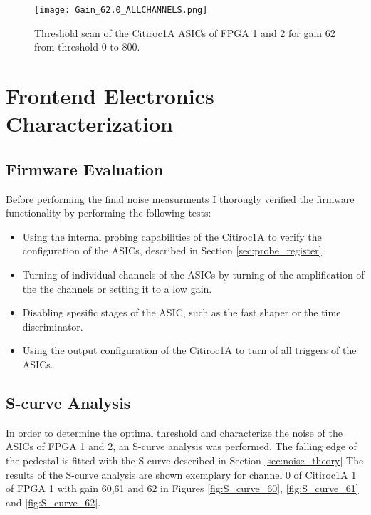     \begin{figure}[H]
        \centering
        \texttt{[image: Gain\_62.0\_ALLCHANNELS.png]}
        \caption{Threshold scan of the Citiroc1A ASICs of FPGA 1 and 2 for gain 62 from threshold 0 to 800.}
        \label{fig:threshold_scan_62}
    \end{figure}
    \section{Frontend Electronics Characterization}
    \subsection{Firmware Evaluation}
    Before performing the final noise measurments I thorougly verified the firmware functionality by performing the following tests:
    \begin{itemize}
        \item Using the internal probing capabilities of the Citiroc1A to verify the configuration of the ASICs, described in Section \ref{sec:probe_register}.
        \item Turning of individual channels of the ASICs by turning of the amplification of the the channels or setting it to a low gain.
        \item Disabling spesific stages of the ASIC, such as the fast shaper or the time discriminator.
        \item Using the output configuration of the Citiroc1A to turn of all triggers of the ASICs.
    \end{itemize}
    \subsection{S-curve Analysis}
    In order to determine the optimal threshold and characterize the noise of the ASICs of FPGA 1 and 2, an S-curve analysis was performed.
    \newline
    The falling edge of the pedestal is fitted with the S-curve described in Section \ref{sec:noise_theory}
    \newline
    The results of the S-curve analysis are shown exemplary for channel 0 of Citiroc1A 1 of FPGA 1 with gain 60,61 and 62 in Figures \ref{fig:S_curve_60}, \ref{fig:S_curve_61} and \ref{fig:S_curve_62}.
    

